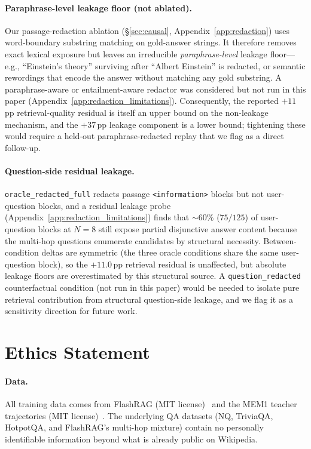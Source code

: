 \documentclass[11pt]{article}
\begin{document}
\paragraph{Paraphrase-level leakage floor (not ablated).}
Our passage-redaction ablation (\S\ref{sec:causal}, Appendix~\ref{app:redaction}) uses word-boundary substring matching on gold-answer strings. It therefore removes exact lexical exposure but leaves an irreducible \emph{paraphrase-level} leakage floor---e.g., ``Einstein's theory'' surviving after ``Albert Einstein'' is redacted, or semantic rewordings that encode the answer without matching any gold substring. A paraphrase-aware or entailment-aware redactor was considered but not run in this paper (Appendix~\ref{app:redaction_limitations}). Consequently, the reported $+11$\,pp retrieval-quality residual is itself an upper bound on the non-leakage mechanism, and the $+37$\,pp leakage component is a lower bound; tightening these would require a held-out paraphrase-redacted replay that we flag as a direct follow-up.

\paragraph{Question-side residual leakage.}
\texttt{oracle\_redacted\_full} redacts passage \texttt{<information>} blocks but not user-question blocks, and a residual leakage probe (Appendix~\ref{app:redaction_limitations}) finds that $\sim\!60\%$ ($75/125$) of user-question blocks at $N\!=\!8$ still expose partial disjunctive answer content because the multi-hop questions enumerate candidates by structural necessity. Between-condition deltas are symmetric (the three oracle conditions share the same user-question block), so the $+11.0$\,pp retrieval residual is unaffected, but absolute leakage floors are overestimated by this structural source. A \texttt{question\_redacted} counterfactual condition (not run in this paper) would be needed to isolate pure retrieval contribution from structural question-side leakage, and we flag it as a sensitivity direction for future work.

\section*{Ethics Statement}

\paragraph{Data.} All training data comes from FlashRAG (MIT license)~\cite{jin2025flashrag} and the MEM1 teacher trajectories (MIT license)~\cite{zhou2025mem1}. The underlying QA datasets (NQ, TriviaQA, HotpotQA, and FlashRAG's multi-hop mixture) contain no personally identifiable information beyond what is already public on Wikipedia.
\end{document}
